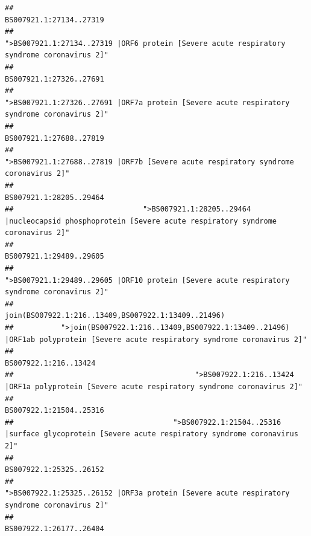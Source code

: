 \documentclass[
]{article}
\begin{document}
\begin{verbatim}
##                                                                                                                BS007921.1:27134..27319 
##                                             ">BS007921.1:27134..27319 |ORF6 protein [Severe acute respiratory syndrome coronavirus 2]" 
##                                                                                                                BS007921.1:27326..27691 
##                                            ">BS007921.1:27326..27691 |ORF7a protein [Severe acute respiratory syndrome coronavirus 2]" 
##                                                                                                                BS007921.1:27688..27819 
##                                                    ">BS007921.1:27688..27819 |ORF7b [Severe acute respiratory syndrome coronavirus 2]" 
##                                                                                                                BS007921.1:28205..29464 
##                              ">BS007921.1:28205..29464 |nucleocapsid phosphoprotein [Severe acute respiratory syndrome coronavirus 2]" 
##                                                                                                                BS007921.1:29489..29605 
##                                            ">BS007921.1:29489..29605 |ORF10 protein [Severe acute respiratory syndrome coronavirus 2]" 
##                                                                                    join(BS007922.1:216..13409,BS007922.1:13409..21496) 
##           ">join(BS007922.1:216..13409,BS007922.1:13409..21496) |ORF1ab polyprotein [Severe acute respiratory syndrome coronavirus 2]" 
##                                                                                                                  BS007922.1:216..13424 
##                                          ">BS007922.1:216..13424 |ORF1a polyprotein [Severe acute respiratory syndrome coronavirus 2]" 
##                                                                                                                BS007922.1:21504..25316 
##                                     ">BS007922.1:21504..25316 |surface glycoprotein [Severe acute respiratory syndrome coronavirus 2]" 
##                                                                                                                BS007922.1:25325..26152 
##                                            ">BS007922.1:25325..26152 |ORF3a protein [Severe acute respiratory syndrome coronavirus 2]" 
##                                                                                                                BS007922.1:26177..26404 

\end{verbatim}
\end{document}
